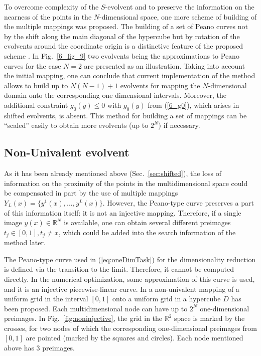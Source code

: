 \documentclass[3p,times,procedia]{elsarticle}
\begin{document}
To overcome complexity of the $S$-evolvent and to preserve the information on the nearness of the points in
the $N$-dimensional space, one more scheme of building of the multiple mappings was proposed.
The building of a set of Peano curves not by the shift along the main diagonal of the hypercube
but by rotation of the evolvents around the coordinate origin is a distinctive feature of the
proposed scheme \cite{Gergel2009}.
In Fig.~\ref{6_fig_9} two evolvents being the approximations to Peano curves for the case
$N=2$ are presented as an illustration.
Taking into account the initial mapping, one can conclude that current implementation of the
method allows to build up to $N(N-1)+1$ evolvents for mapping the $N$-dimensional domain
onto the corresponding one-dimensional intervals. Moreover, the additional constraint  $g_0(y)
\leq 0$ with $g_0(y)$ from (\ref{6_g0}), which arises in shifted evolvents, is absent. This
method for building a set of mappings can be ``scaled'' easily to obtain more evolvents (up to
$2^N$) if necessary.


\subsection{Non-Univalent evolvent}

As it has been already mentioned above (Sec.~\ref{sec:shifted}), the loss of information on the
proximity of the points in the multidimensional space could be compensated in part by the use
of multiple mappings $Y_L(x)=\{y^1(x),...,y^L(x)\}$. However, the Peano-type curve preserves
a part of this information itself: it is not an injective mapping. Therefore, if a single image
$y(x)\in \mathbb{R}^N$ is available, one can obtain several different preimages
$t_j\in[0,1], t_j \not = x$, which could be added into the search information of the method later.

The Peano-type curve used in (\ref{eq:oneDimTask}) for the dimensionality reduction is
defined via the transition to the limit. Therefore, it cannot be computed directly. In the
numerical optimization, some approximation of this curve is used, and it is an injective piecewise-linear curve. In \cite{strongin1978} a non-univalent mapping of a uniform grid in the
interval $[0,1]$ onto a uniform grid in a hypercube $D$ has been proposed. Each
multidimensional node can have up to $2^N$ one-dimensional preimages. In
Fig.~\ref{fig:noninjective}, the grid in the $\mathbb{R}^2$ space is marked by the crosses, for
two nodes of which the corresponding one-dimensional preimages from $[0,1]$ are pointed
(marked by the squares and circles). Each node mentioned above has 3 preimages.
\end{document}
